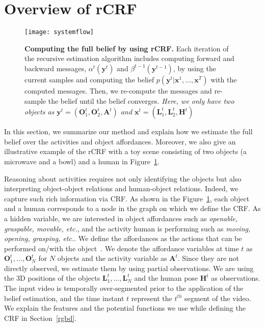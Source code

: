 
\section{Overview of rCRF}
\label{overview}
\begin{figure}[t]
  \texttt{[image: systemflow]}
  \caption{{\bf Computing the full belief by using rCRF.} Each iteration of the recursive estimation algorithm includes computing forward and backward messages, $\alpha^t(\mathbf{y}^t)$ and $\beta^{t-1}(\mathbf{y}^{t-1})$, by using the current samples and computing the belief $p(\mathbf{y}^t|\mathbf{x}^1,\ldots,\mathbf{x}^T)$ with the computed messages. Then, we re-compute the messages and re-sample the belief until the belief converges. \emph{Here, we only have two objects as  $\mathbf{y}^t=(\mathbf{O}^t_1,\mathbf{O}^t_2,\mathbf{A}^t)$ and $\mathbf{x}^t=(\mathbf{L}^t_1,\mathbf{L}^t_2,\mathbf{H}^t)$ }}
  \label{system}
\end{figure}
In this section, we summarize our method and explain how we estimate the full belief over the activities and object affordances. Moreover, we also give an illustrative example of the rCRF with a toy scene consisting of two objects (a microwave and a bowl) and a human in Figure~\ref{system}.

Reasoning about activities requires not only identifying the objects but also interpreting object-object relations and human-object relations. Indeed, we capture such rich information via CRF. As shown in the Figure~\ref{system}, each object and a human corresponds to a node in the graph on which we define the CRF. As a hidden variable, we are interested in object affordances such as \emph{openable, graspable, movable, etc.}, and the activity human is performing such as \emph{moving, opening, grasping, etc.}. We define the affordances as the actions that can be performed on/with the object~\cite{gibson1979}. We denote the affordance variables at time $t$ as $\mathbf{O}^t_1, \ldots, \mathbf{O}^t_N$ for $N$ objects and the activity variable as $\mathbf{A}^t$. Since they are not directly observed, we estimate them by using partial observations. We are using the 3D positions of the objects $\mathbf{L}^t_1,\ldots,\mathbf{L}^t_N$ and the human pose $\mathbf{H}^t$ as observations. %
The input video is temporally over-segmented prior to the application of the belief estimation, and the time instant $t$ represent the $t^{th}$ segment of the video. We explain the features and the potential functions we use while defining the CRF in Section~\ref{rgbd}.

